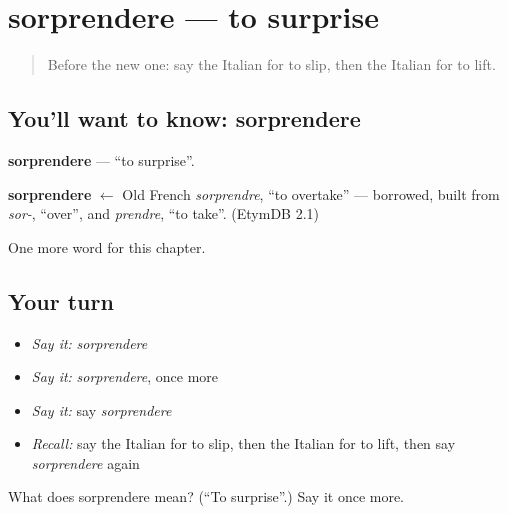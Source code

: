 \section[sorprendere]{sorprendere — to surprise}

\label{lesson:IT-C184-sorprendere}



\begin{quote}
Before the new one: say the Italian for to slip, then the Italian for to lift.
\end{quote}

\subsection*{You'll want to know: sorprendere}
\textbf{sorprendere} — \textquotedblleft{}to surprise\textquotedblright{}.

\begin{cousinweb}
\textbf{sorprendere} $\leftarrow$ Old French \emph{sorprendre}, \textquotedblleft{}to overtake\textquotedblright{} — borrowed, built from \emph{sor-}, \textquotedblleft{}over\textquotedblright{}, and \emph{prendre}, \textquotedblleft{}to take\textquotedblright{}. (EtymDB 2.1)
\end{cousinweb}

\begin{grammarlens}[title={What you've built}]
One more word for this chapter.
\end{grammarlens}

\subsection*{Your turn}
\begin{itemize}
\raggedright
  \item \emph{Say it:} \emph{sorprendere}
  \item \emph{Say it:} \emph{sorprendere}, once more
  \item \emph{Say it:} say \emph{sorprendere}
  \item \emph{Recall:} say the Italian for to slip, then the Italian for to lift, then say \emph{sorprendere} again
\end{itemize}

\begin{tcolorbox}[breakable,colback=teal!4,colframe=teal!35!black,title={Before you move on}]
What does sorprendere mean? (\textquotedblleft{}To surprise\textquotedblright{}.) Say it once more.
\end{tcolorbox}
